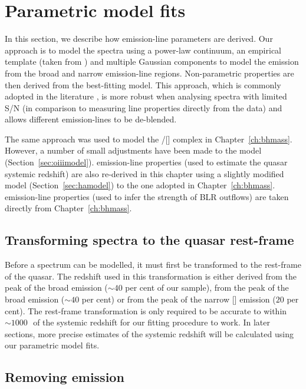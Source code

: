 \section{Parametric model fits}

In this section, we describe how emission-line parameters are derived. 
Our approach is to model the spectra using a power-law continuum, an empirical  template (taken from \citealt{boroson92}) and multiple Gaussian components to model the emission from the broad and narrow emission-line regions.
Non-parametric properties are then derived from the best-fitting model. 
This approach, which is commonly adopted in the literature \citep[e.g.][]{shen11,shen12,shen16a}, is more robust when analysing spectra with limited S/N (in comparison to measuring line properties directly from the data) and allows different emission-lines to be de-blended.

The same approach was used to model the \hbns/[] complex in Chapter~\ref{ch:bhmass}. 
However, a number of small adjustments have been made to the model (Section~\ref{sec:oiiimodel}). 
\ha emission-line properties (used to estimate the quasar systemic redshift) are also re-derived in this chapter using a slightly modified model (Section~\ref{sec:hamodel}) to the one adopted in Chapter~\ref{ch:bhmass}. 
 emission-line properties (used to infer the strength of BLR outflows) are taken directly from Chapter~\ref{ch:bhmass}. 

\subsection{Transforming spectra to the quasar rest-frame}

Before a spectrum can be modelled, it must first be transformed to the rest-frame of the quasar.  
The redshift used in this transformation is either derived from the peak of the broad \ha emission ($\sim40$ per cent of our sample), from the peak of the broad \hb emission ($\sim40$ per cent) or from the peak of the narrow [] emission ($20$ per cent).
The rest-frame transformation is only required to be accurate to within $\sim1000$\,\kms\, of the systemic redshift for our fitting procedure to work. 
In later sections, more precise estimates of the systemic redshift will be calculated using our parametric model fits. 

\subsection{Removing  emission}

